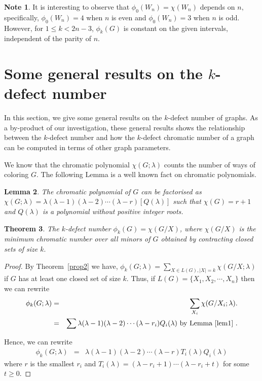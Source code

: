 \documentclass[12pt]{amsart}
\newtheorem{theorem}{Theorem}[section]
\newtheorem{lemma}[theorem]{Lemma}
\theoremstyle{definition}
\newtheorem{note}[theorem]{Note}
\theoremstyle{remark}
\numberwithin{equation}{section}
\begin{document}
\begin{note}
It is interesting to observe that $\phi_0(W_n) = \chi(W_n)$ depends on $n,$ specifically, $\phi_0(W_n) = 4$ when $n$  is even and  $\phi_0(W_n) = 3$ when $n$ is odd. However, for $1\leq k < 2n-3$, $\phi_k(G)$ is constant on the given intervals, independent of the parity of $n$.
\end{note}

\section{Some general results on the $k$-defect number}
\label{sec4}
In this section, we give some general results on the $k$-defect number of graphs. As a by-product of our investigation, these general results shows the relationship between the $k$-defect number and how the $k$-defect chromatic number of a graph can be computed in terms of other graph parameters.

We know that the chromatic polynomial  $\chi (G; \lambda)$ counts the number of ways of coloring $G.$ The following Lemma is a well known fact on chromatic polynomials.
\begin{lemma}
\label{lem1}
 The chromatic polynomial of $G$ can be factorised as 
 $\chi (G; \lambda)= \lambda (\lambda -1)(\lambda -2) \cdots (\lambda -r)[Q(\lambda)]$ such that $\chi(G)=r+1$  and $Q(\lambda)$ is a polynomial without positive integer roots.   
\end{lemma}
\begin{theorem}The $k$-defect number $\phi_k(G) = \chi(G/X)$, where $\chi(G/X)$ is the  minimum chromatic number  over all minors of $G$ obtained by contracting closed sets of size $k.$
\label{th:kdefectcontr}
\end{theorem}
\begin{proof} 
By Theorem~\ref{prop2} we have,
$\displaystyle \phi_{k}(G;\lambda) = \sum_{X\in L(G),\vert X \vert = k} \chi (G/X; \lambda)$ if $G$ has at least one closed set  of size $k.$ Thus,  if $L(G) = \{X_1, X_2, \cdots , X_n\}$ then we can rewrite 
\begin{eqnarray*}
   \phi_{k}(G;\lambda) &=& \sum_{X_i} \chi(G/X_i; \lambda).\\
   &=&  \sum\lambda(\lambda -1)(\lambda -2) \cdots (\lambda -r_i)  Q_i(\lambda) \text{ by Lemma~\ref{lem1} }.\\
\end{eqnarray*}

Hence, we can rewrite
\begin{eqnarray*}
   \phi_{k}(G;\lambda) 
   &=& \lambda(\lambda -1)(\lambda -2) \cdots (\lambda -r) T_i(\lambda) Q_i(\lambda)
\end{eqnarray*}
where $r$ is the smallest $r_i$ and $T_i(\lambda) = (\lambda -r_i+1) \cdots (\lambda -r_i+t)$ for some $t \geq 0.$

    
\end{proof}
\end{document}
